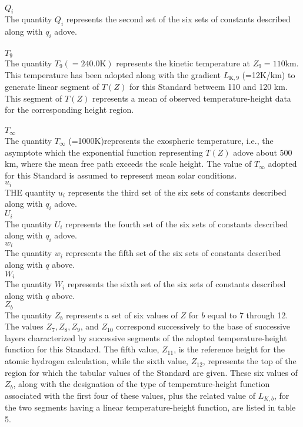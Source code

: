 \documentclass{article}
\begin{document}
\\$Q_i$\\
The quantity $Q_i$ represents the second set of the six sets of constants described along with $q_i$ adove.\\
\\$T_9$\\
The quantity $T_9 (=240.0\text{K})$ represents the kinetic temperature at $Z_9 = 110\mathrm{km}$. This temperature has been adopted along with the gradient $L_{\text{K},9}$ (=12K/km) to generate linear segment of $T(Z)$ for this Standard betweem 110 and 120 km. This segment of $T(Z)$ represents a mean of observed temperature-height data for the corresponding height region.\\
\\$T_\infty$\\
The quantity $T_\infty$ (=1000K)represents the exospheric temperature, i.e., the asymptote which the exponential function representing $T(Z)$ adove about 500 km, where the mean free path exceeds the scale height. The value of $T_\infty$ adopted for this Standard is assumed to represent mean solar conditions.
\\$u_i$\\
THE quantity $u_i$ represents the third set of the six sets of constants described along with $q_i$ adove.
\\$U_i$\\
The quantity $U_i$ represents the fourth set of the six sets of constants described along with $q_i$ adove.
\\$w_i$\\
The quantity $w_i$ represents the fifth set of the six sets of constants described along with $q$ above.
\\$W_i$\\
The quantity $W_i$ represents the sixth set of the six sets of constants described along with $q$ above.
\\$Z_b$\\
The quantity $Z_b$ represents a set of six values of $Z$ for $b$ equal to 7 through 12. The values $Z_7, Z_8, Z_9$, and $Z_{10}$ correspond successively to the base of successive layers characterized by successive segments of the adopted temperature-height function for this Standard. The fifth value, $Z_{11}$, is the reference height for the atomic hydrogen calculation, while the sixth value, $Z_{12}$, represents the top of the region for which the tabular values of the Standard are given. These six values of $Z_b$, along with the designation of the type of temperature-height function associated with the first four of these values, plus the related value of $L_{K,b}$, for the two segments having a linear temperature-height function, are listed in table 5.\\
\end{document}
